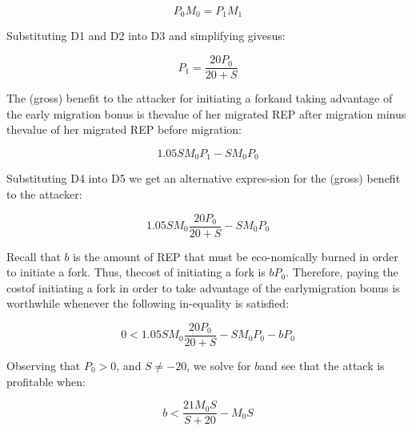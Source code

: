 \documentclass[12pt,floatfix,reprint,nofootinbib,amsmath,amssymb,epsfig,pre,floats,letterpaper,groupedaffiliation]{revtex4-1}
\theoremstyle{definition}
\theoremstyle{definition}
\begin{document}
\begin{equation}
P_0M_0 = P_1M_1\tag{D3}
\end{equation}

Substituting D1 and D2 into D3 and simplifying gives\linebreak us:

\begin{equation}
P_1 = \frac{20P_0}{20 + S}\tag{D4}
\end{equation}

The (gross) benefit to the attacker for initiating a fork\linebreak and taking advantage of the early migration bonus is the\linebreak value of her migrated REP after migration minus the\linebreak value of her migrated REP before migration:

\begin{equation}
1.05SM_0P_1 - SM_0P_0\tag{D5}
\end{equation}

Substituting D4 into D5 we get an alternative expres-\linebreak sion for the (gross) benefit to the attacker:

\begin{equation}
1.05SM_0\frac{20P_0}{20 + S} - SM_0P_0\tag{D6}
\end{equation}

Recall that $b$ is the amount of REP that must be eco-\linebreak nomically burned in order to initiate a fork. Thus, the\linebreak cost of initiating a fork is $bP_0$. Therefore, paying the cost\linebreak of initiating a fork in order to take advantage of the early\linebreak migration bonus is worthwhile whenever the following in-\linebreak equality is satisfied:

\begin{equation}
0 < 1.05SM_0\frac{20P_0}{20 + S} - SM_0P_0 - bP_0\tag{D7}
\end{equation}

Observing that $P_0 > 0$, and $S \neq -20$, we solve for $b$\linebreak and see that the attack is profitable when:

\begin{equation}
b < \frac{21M_0S}{S + 20} - M_0S\tag{D8}
\end{equation}
\end{document}

